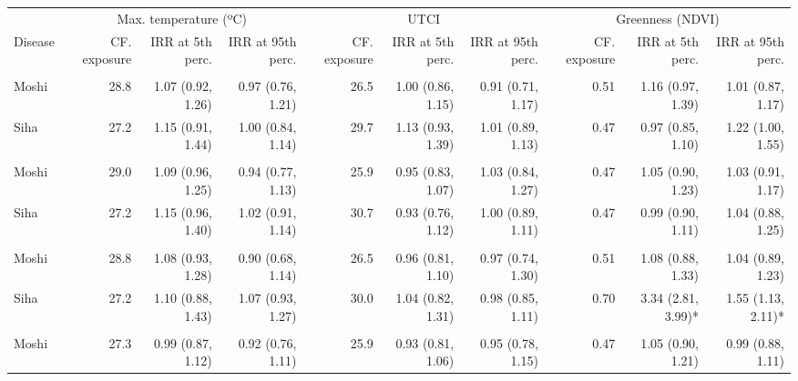 \begin{table}[t]
\fontsize{12.0pt}{14.4pt}\selectfont
\begin{tabular*}{\linewidth}{@{\extracolsep{\fill}}l|rrrrrrrrr}
\toprule
 & \multicolumn{3}{c}{Max. temperature (ºC)} & \multicolumn{3}{c}{UTCI} & \multicolumn{3}{c}{Greenness (NDVI)} \\ 
\cmidrule(lr){2-4} \cmidrule(lr){5-7} \cmidrule(lr){8-10}
Disease & CF. exposure & IRR at 5th perc. & IRR at 95th perc. & CF. exposure & IRR at 5th perc. & IRR at 95th perc. & CF. exposure & IRR at 5th perc. & IRR at 95th perc. \\ 
\midrule\addlinespace[2.5pt]
\multicolumn{10}{l}{Chronic Respiratory Disease} \\[2.5pt] 
\midrule\addlinespace[2.5pt]
Moshi & 28.8 & 1.07 (0.92, 1.26)  & 0.97 (0.76, 1.21)  & 26.5 & 1.00 (0.86, 1.15)  & 0.91 (0.71, 1.17)  & 0.51 & 1.16 (0.97, 1.39)  & 1.01 (0.87, 1.17)  \\ 
Siha & 27.2 & 1.15 (0.91, 1.44)  & 1.00 (0.84, 1.14)  & 29.7 & 1.13 (0.93, 1.39)  & 1.01 (0.89, 1.13)  & 0.47 & 0.97 (0.85, 1.10)  & 1.22 (1.00, 1.55)  \\ 
\midrule\addlinespace[2.5pt]
\multicolumn{10}{l}{Hypertension} \\[2.5pt] 
\midrule\addlinespace[2.5pt]
Moshi & 29.0 & 1.09 (0.96, 1.25)  & 0.94 (0.77, 1.13)  & 25.9 & 0.95 (0.83, 1.07)  & 1.03 (0.84, 1.27)  & 0.47 & 1.05 (0.90, 1.23)  & 1.03 (0.91, 1.17)  \\ 
Siha & 27.2 & 1.15 (0.96, 1.40)  & 1.02 (0.91, 1.14)  & 30.7 & 0.93 (0.76, 1.12)  & 1.00 (0.89, 1.11)  & 0.47 & 0.99 (0.90, 1.11)  & 1.04 (0.88, 1.25)  \\ 
\midrule\addlinespace[2.5pt]
\multicolumn{10}{l}{Diabetes Mellitus} \\[2.5pt] 
\midrule\addlinespace[2.5pt]
Moshi & 28.8 & 1.08 (0.93, 1.28)  & 0.90 (0.68, 1.14)  & 26.5 & 0.96 (0.81, 1.10)  & 0.97 (0.74, 1.30)  & 0.51 & 1.08 (0.88, 1.33)  & 1.04 (0.89, 1.23)  \\ 
Siha & 27.2 & 1.10 (0.88, 1.43)  & 1.07 (0.93, 1.27)  & 30.0 & 1.04 (0.82, 1.31)  & 0.98 (0.85, 1.11)  & 0.70 & 3.34 (2.81, 3.99)* & 1.55 (1.13, 2.11)* \\ 
\midrule\addlinespace[2.5pt]
\multicolumn{10}{l}{Upper Respiratory Infections} \\[2.5pt] 
\midrule\addlinespace[2.5pt]
Moshi & 27.3 & 0.99 (0.87, 1.12)  & 0.92 (0.76, 1.11)  & 25.9 & 0.93 (0.81, 1.06)  & 0.95 (0.78, 1.15)  & 0.47 & 1.05 (0.90, 1.21)  & 0.99 (0.88, 1.11)  \\ 

\end{tabular*}
\end{table}
